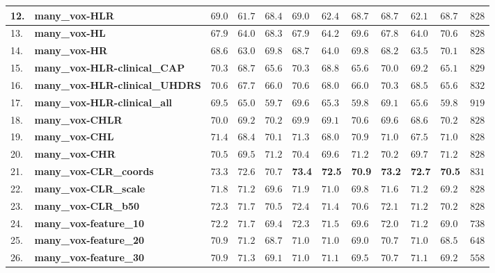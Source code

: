 {\begin{longtable}[H]{|p{0.6cm}|p{10.3cm}|p{1.1cm}|p{1.1cm}|p{1.1cm}|p{1.1cm}|p{1.1cm}|p{1.1cm}|p{1.1cm}|p{1.1cm}|p{1.1cm}|r|}
12. & \textbf{many\_vox-HLR} & $69.0$ & $61.7$ & $68.4$ & $69.0$ & $62.4$ & $68.7$ & $68.7$ & $62.1$ & $68.7$ & $828$ \\ \hline
13. & \textbf{many\_vox-HL} & $67.9$ & $64.0$ & $68.3$ & $67.9$ & $64.2$ & $69.6$ & $67.8$ & $64.0$ & $70.6$ & $828$ \\ \hline
14. & \textbf{many\_vox-HR} & $68.6$ & $63.0$ & $69.8$ & $68.7$ & $64.0$ & $69.8$ & $68.2$ & $63.5$ & $70.1$ & $828$ \\ \hline
15. & \textbf{many\_vox-HLR-clinical\_CAP} & $70.3$ & $68.7$ & $65.6$ & $70.3$ & $68.8$ & $65.6$ & $70.0$ & $69.2$ & $65.1$ & $829$ \\ \hline
16. & \textbf{many\_vox-HLR-clinical\_UHDRS} & $70.6$ & $67.7$ & $66.0$ & $70.6$ & $68.0$ & $66.0$ & $70.3$ & $68.5$ & $65.6$ & $832$ \\ \hline
17. & \textbf{many\_vox-HLR-clinical\_all} & $69.5$ & $65.0$ & $59.7$ & $69.6$ & $65.3$ & $59.8$ & $69.1$ & $65.6$ & $59.8$ & $919$ \\ \hline
18. & \textbf{many\_vox-CHLR} & $70.0$ & $69.2$ & $70.2$ & $69.9$ & $69.1$ & $70.6$ & $69.6$ & $68.6$ & $70.2$ & $828$ \\ \hline
19. & \textbf{many\_vox-CHL} & $71.4$ & $68.4$ & $70.1$ & $71.3$ & $68.0$ & $70.9$ & $71.0$ & $67.5$ & $71.0$ & $828$ \\ \hline
20. & \textbf{many\_vox-CHR} & $70.5$ & $69.5$ & $71.2$ & $70.4$ & $69.6$ & $71.2$ & $70.2$ & $69.7$ & $71.2$ & $828$ \\ \hline
21. & \textbf{many\_vox-CLR\_coords} & $73.3$ & $72.6$ & $70.7$ & \textbf{73.4} & \textbf{72.5} & \textbf{70.9} & \textbf{73.2} & \textbf{72.7} & \textbf{70.5} & $831$ \\ \hline
22. & \textbf{many\_vox-CLR\_scale} & $71.8$ & $71.2$ & $69.6$ & $71.9$ & $71.0$ & $69.8$ & $71.6$ & $71.2$ & $69.2$ & $828$ \\ \hline
23. & \textbf{many\_vox-CLR\_b50} & $72.3$ & $71.7$ & $70.5$ & $72.4$ & $71.4$ & $70.6$ & $72.1$ & $71.2$ & $70.2$ & $828$ \\ \hline
24. & \textbf{many\_vox-feature\_10} & $72.2$ & $71.7$ & $69.4$ & $72.3$ & $71.5$ & $69.6$ & $72.0$ & $71.2$ & $69.0$ & $738$ \\ \hline
25. & \textbf{many\_vox-feature\_20} & $70.9$ & $71.2$ & $68.7$ & $71.0$ & $71.0$ & $69.0$ & $70.7$ & $71.0$ & $68.5$ & $648$ \\ \hline
26. & \textbf{many\_vox-feature\_30} & $70.9$ & $71.3$ & $69.1$ & $71.0$ & $71.1$ & $69.5$ & $70.7$ & $71.1$ & $69.2$ & $558$ \\ \hline

\end{longtable}}
